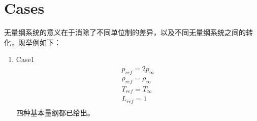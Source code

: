 \documentclass[a4paper,11pt]{article}
\begin{document}
\section{Cases}
无量纲系统的意义在于消除了不同单位制的差异，以及不同无量纲系统之间的转化，现举例如下：
\begin{enumerate}
    \item {Case1} \\
        \begin{eqnarray}
            p_{ref} = 2p_{\infty} \\
            \rho_{ref} = \rho_{\infty} \\
            T_{ref} = T_{\infty} \\
            L_{ref} = 1 \\
        \end{eqnarray}
        四种基本量纲都已给出。


\end{enumerate}
\end{document}
